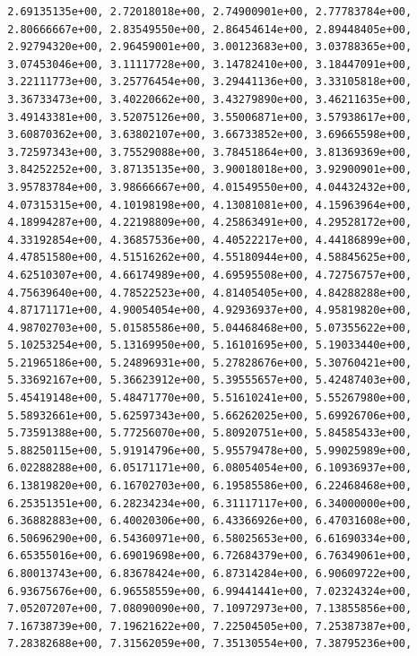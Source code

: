 \documentclass[
  letterpaper,
]{scrreprt}
\begin{document}
\begin{verbatim}
       2.69135135e+00, 2.72018018e+00, 2.74900901e+00, 2.77783784e+00,
       2.80666667e+00, 2.83549550e+00, 2.86454614e+00, 2.89448405e+00,
       2.92794320e+00, 2.96459001e+00, 3.00123683e+00, 3.03788365e+00,
       3.07453046e+00, 3.11117728e+00, 3.14782410e+00, 3.18447091e+00,
       3.22111773e+00, 3.25776454e+00, 3.29441136e+00, 3.33105818e+00,
       3.36733473e+00, 3.40220662e+00, 3.43279890e+00, 3.46211635e+00,
       3.49143381e+00, 3.52075126e+00, 3.55006871e+00, 3.57938617e+00,
       3.60870362e+00, 3.63802107e+00, 3.66733852e+00, 3.69665598e+00,
       3.72597343e+00, 3.75529088e+00, 3.78451864e+00, 3.81369369e+00,
       3.84252252e+00, 3.87135135e+00, 3.90018018e+00, 3.92900901e+00,
       3.95783784e+00, 3.98666667e+00, 4.01549550e+00, 4.04432432e+00,
       4.07315315e+00, 4.10198198e+00, 4.13081081e+00, 4.15963964e+00,
       4.18994287e+00, 4.22198809e+00, 4.25863491e+00, 4.29528172e+00,
       4.33192854e+00, 4.36857536e+00, 4.40522217e+00, 4.44186899e+00,
       4.47851580e+00, 4.51516262e+00, 4.55180944e+00, 4.58845625e+00,
       4.62510307e+00, 4.66174989e+00, 4.69595508e+00, 4.72756757e+00,
       4.75639640e+00, 4.78522523e+00, 4.81405405e+00, 4.84288288e+00,
       4.87171171e+00, 4.90054054e+00, 4.92936937e+00, 4.95819820e+00,
       4.98702703e+00, 5.01585586e+00, 5.04468468e+00, 5.07355622e+00,
       5.10253254e+00, 5.13169950e+00, 5.16101695e+00, 5.19033440e+00,
       5.21965186e+00, 5.24896931e+00, 5.27828676e+00, 5.30760421e+00,
       5.33692167e+00, 5.36623912e+00, 5.39555657e+00, 5.42487403e+00,
       5.45419148e+00, 5.48471770e+00, 5.51610241e+00, 5.55267980e+00,
       5.58932661e+00, 5.62597343e+00, 5.66262025e+00, 5.69926706e+00,
       5.73591388e+00, 5.77256070e+00, 5.80920751e+00, 5.84585433e+00,
       5.88250115e+00, 5.91914796e+00, 5.95579478e+00, 5.99025989e+00,
       6.02288288e+00, 6.05171171e+00, 6.08054054e+00, 6.10936937e+00,
       6.13819820e+00, 6.16702703e+00, 6.19585586e+00, 6.22468468e+00,
       6.25351351e+00, 6.28234234e+00, 6.31117117e+00, 6.34000000e+00,
       6.36882883e+00, 6.40020306e+00, 6.43366926e+00, 6.47031608e+00,
       6.50696290e+00, 6.54360971e+00, 6.58025653e+00, 6.61690334e+00,
       6.65355016e+00, 6.69019698e+00, 6.72684379e+00, 6.76349061e+00,
       6.80013743e+00, 6.83678424e+00, 6.87314284e+00, 6.90609722e+00,
       6.93675676e+00, 6.96558559e+00, 6.99441441e+00, 7.02324324e+00,
       7.05207207e+00, 7.08090090e+00, 7.10972973e+00, 7.13855856e+00,
       7.16738739e+00, 7.19621622e+00, 7.22504505e+00, 7.25387387e+00,
       7.28382688e+00, 7.31562059e+00, 7.35130554e+00, 7.38795236e+00,

\end{verbatim}
\end{document}
